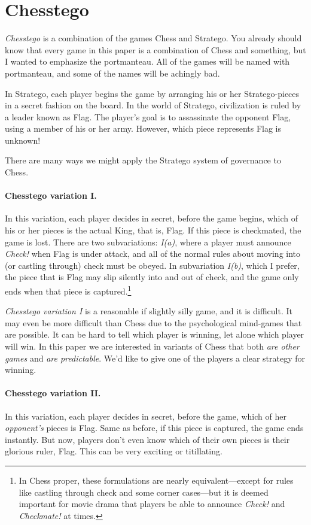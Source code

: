 \documentclass[twocolumn]{article}
\begin{document}
\section{Chesstego}

{\em Chesstego} is a combination of the games Chess and Stratego. You
already should know that every game in this paper is a combination of
Chess and something, but I wanted to emphasize the portmanteau. All of
the games will be named with portmanteau, and some of the names will
be achingly bad.

In Stratego, each player begins the game by arranging his or her
Stratego-pieces in a secret fashion on the board. In the world of
Stratego, civilization is ruled by a leader known as Flag. The
player's goal is to assassinate the opponent Flag, using a member of
his or her army. However, which piece represents Flag is unknown!

There are many ways we might apply the Stratego system of governance
to Chess.

\paragraph{Chesstego variation I.} In this variation, each player decides
in secret, before the game begins, which of his or her pieces is the
actual King, that is, Flag. If this piece is checkmated, the game
is lost. There are two subvariations: {\em I(a)}, where a player must
announce {\em Check!} when Flag is under attack, and all of the
normal rules about moving into (or castling through) check must be
obeyed. In subvariation {\em I(b)}, which I prefer, the piece that is
Flag may slip silently into and out of check, and the game only ends
when that piece is captured.\!\footnote{In Chess proper, these
  formulations are nearly equivalent---except for rules like castling
  through check and some corner cases---but it is deemed important for
  movie drama that players be able to announce {\em Check!} and {\em
    Checkmate!} at times.}

{\em Chesstego variation I} is a reasonable if slightly silly game,
and it is difficult. It may even be more difficult than Chess due to the
psychological mind-games that are possible. It can be hard to tell which
player is winning, let alone which player will win. In this paper we
are interested in variants of Chess that both {\em are other games} and
{\em are predictable}. We'd like to give one of the players a clear
strategy for winning.

\paragraph{Chesstego variation II.} In this variation, each player
decides in secret, before the game, which of her {\em opponent's} pieces
is Flag. Same as before, if this piece is captured, the game ends
instantly. But now, players don't even know which of their own pieces
is their glorious ruler, Flag. This can be very exciting or titillating.
\end{document}
